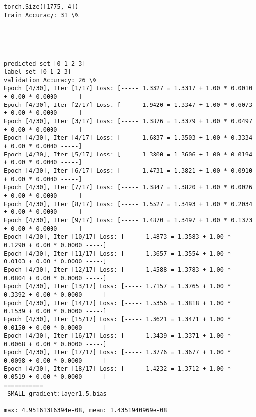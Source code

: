 \documentclass[11pt]{article}
\begin{document}
    \begin{Verbatim}[commandchars=\\\{\}]
torch.Size([1775, 4])
Train Accuracy: 31 \%

    \end{Verbatim}

    \begin{center}
    \end{center}
    { \hspace*{\fill} \\}
    
    \begin{center}
    \end{center}
    { \hspace*{\fill} \\}
    
    \begin{Verbatim}[commandchars=\\\{\}]
predicted set [0 1 2 3]
label set [0 1 2 3]
validation Accuracy: 26 \%
Epoch [4/30], Iter [1/17] Loss: [----- 1.3327 = 1.3317 + 1.00 * 0.0010 + 0.00 * 0.0000 -----]
Epoch [4/30], Iter [2/17] Loss: [----- 1.9420 = 1.3347 + 1.00 * 0.6073 + 0.00 * 0.0000 -----]
Epoch [4/30], Iter [3/17] Loss: [----- 1.3876 = 1.3379 + 1.00 * 0.0497 + 0.00 * 0.0000 -----]
Epoch [4/30], Iter [4/17] Loss: [----- 1.6837 = 1.3503 + 1.00 * 0.3334 + 0.00 * 0.0000 -----]
Epoch [4/30], Iter [5/17] Loss: [----- 1.3800 = 1.3606 + 1.00 * 0.0194 + 0.00 * 0.0000 -----]
Epoch [4/30], Iter [6/17] Loss: [----- 1.4731 = 1.3821 + 1.00 * 0.0910 + 0.00 * 0.0000 -----]
Epoch [4/30], Iter [7/17] Loss: [----- 1.3847 = 1.3820 + 1.00 * 0.0026 + 0.00 * 0.0000 -----]
Epoch [4/30], Iter [8/17] Loss: [----- 1.5527 = 1.3493 + 1.00 * 0.2034 + 0.00 * 0.0000 -----]
Epoch [4/30], Iter [9/17] Loss: [----- 1.4870 = 1.3497 + 1.00 * 0.1373 + 0.00 * 0.0000 -----]
Epoch [4/30], Iter [10/17] Loss: [----- 1.4873 = 1.3583 + 1.00 * 0.1290 + 0.00 * 0.0000 -----]
Epoch [4/30], Iter [11/17] Loss: [----- 1.3657 = 1.3554 + 1.00 * 0.0103 + 0.00 * 0.0000 -----]
Epoch [4/30], Iter [12/17] Loss: [----- 1.4588 = 1.3783 + 1.00 * 0.0804 + 0.00 * 0.0000 -----]
Epoch [4/30], Iter [13/17] Loss: [----- 1.7157 = 1.3765 + 1.00 * 0.3392 + 0.00 * 0.0000 -----]
Epoch [4/30], Iter [14/17] Loss: [----- 1.5356 = 1.3818 + 1.00 * 0.1539 + 0.00 * 0.0000 -----]
Epoch [4/30], Iter [15/17] Loss: [----- 1.3621 = 1.3471 + 1.00 * 0.0150 + 0.00 * 0.0000 -----]
Epoch [4/30], Iter [16/17] Loss: [----- 1.3439 = 1.3371 + 1.00 * 0.0068 + 0.00 * 0.0000 -----]
Epoch [4/30], Iter [17/17] Loss: [----- 1.3776 = 1.3677 + 1.00 * 0.0098 + 0.00 * 0.0000 -----]
Epoch [4/30], Iter [18/17] Loss: [----- 1.4232 = 1.3712 + 1.00 * 0.0519 + 0.00 * 0.0000 -----]
===========
 SMALL gradient:layer1.5.bias
---------
max: 4.95161316394e-08, mean: 1.4351940969e-08

    \end{Verbatim}
\end{document}

